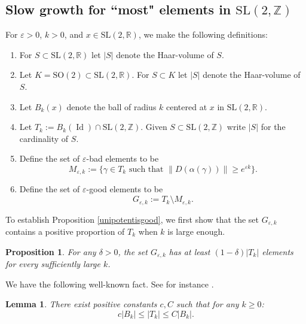 \documentclass[10pt,reqno]{amsart}
\theoremstyle{Theorem}
\newtheorem{proposition}[theorem]{Proposition}
\newtheorem{lemma}[theorem]{Lemma}
\theoremstyle{definition}
\theoremstyle{remark}
\newcommand{\note}[1]{\marginpar{{\color{red}\footnotesize \begin{spacing}{1}#1\end{spacing}}}}
\renewcommand{\epsilon}{\varepsilon}
\DeclareMathOperator{\Id}{Id}
\newcommand{\R}{\mathbb {R}}
\newcommand{\Z}{\mathbb {Z}}
\newcommand{\e}{\epsilon}
\newcommand{\Sl}{\mathrm{SL}}
\newcommand{\So}{\mathrm{SO}}
\def\blue{}
\begin{document}
\subsection{Slow growth for ``most" elements in $\Sl(2,\Z)$}
\label{subsection:slowgrowthgeneric}
For $\epsilon>0$, $k >0$, and $x \in \Sl(2, \R)$, we make the following definitions:

\begin{enumerate}
\item For $S\subset \Sl(2,\R)$  let $|S|$ denote the Haar-volume of $S$.
\item Let $K = \So(2) \subset \Sl(2,\R)$.  For $S\subset  K$   let $|S|$ denote the Haar-volume of $S$.
\item Let $B_k(x)$ denote the ball of radius $k$ centered at $x$ in $\Sl(2, \R)$.
\item Let $T_k := B_k(\Id) \cap \Sl(2, \Z)$.  Given $S\subset \Sl(2,\Z)$ write $|S|$ for the cardinality of $S$.
\item Define the  set of $\e$-bad elements to be $$M_{\e, k} := \{ \gamma \in T_k \text{ such that }   \|D(\alpha(\gamma))\| \geq e^{\e k }\}.$$
\item Define the set of $\e$-good elements to be $$G_{\e,k} := T_k \setminus M_{\e, k} .$$

\end{enumerate}

To establish Proposition \ref{unipotentisgood}, we first  show that the set $G_{\e,k}$ contains a positive proportion of $T_k$ when $k$ is large enough.
\begin{proposition}\label{mainunipo} For any $\delta > 0$,  the set $G_{\e,k}$ has at least $(1- \delta)|T_k|$ elements for every sufficiently large $k$. %
\end{proposition}



We have the following  well-known fact.  {\blue See for instance \cite[Section 2]{MR1230290}.}%

\begin{lemma}\label{basic} There exist  positive constants $c, C$ such that for any $k \geq0$: $$ c|B_k| \leq |T_k| \leq C|B_k|.$$
\end{lemma}
\end{document}

